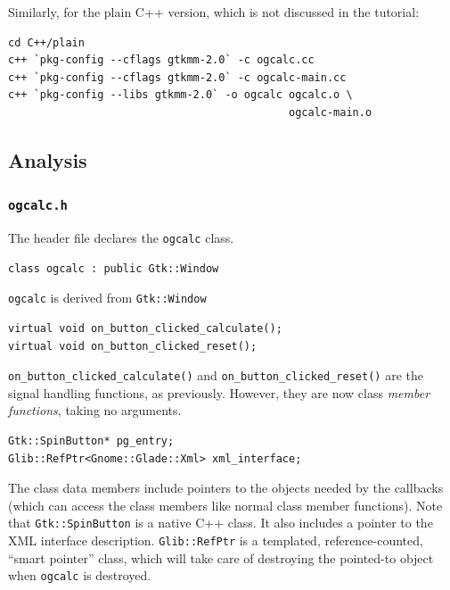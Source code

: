 \documentclass[a4paper,oneside]{article}
\newcommand{\filename}[1]{\texttt{#1}}
\newcommand{\class}[1]{\texttt{#1}}
\newcommand{\function}[1]{\texttt{#1()}}
\begin{document}
Similarly, for the plain C++ version, which is not discussed in the
tutorial:

\begin{verbatim}
cd C++/plain
c++ `pkg-config --cflags gtkmm-2.0` -c ogcalc.cc
c++ `pkg-config --cflags gtkmm-2.0` -c ogcalc-main.cc
c++ `pkg-config --libs gtkmm-2.0` -o ogcalc ogcalc.o \
                                            ogcalc-main.o
\end{verbatim}

\subsection{Analysis}

\subsubsection{\filename{ogcalc.h}}

The header file declares the \class{ogcalc} class.

\begin{lstlisting}[numbers=none, language={[GNU]C++}]
class ogcalc : public Gtk::Window
\end{lstlisting}

\class{ogcalc} is derived from \class{Gtk::Window}

\begin{lstlisting}[numbers=none, language={[GNU]C++}]
virtual void on_button_clicked_calculate();
virtual void on_button_clicked_reset();
\end{lstlisting}

\function{on\_button\_clicked\_calculate} and
\function{on\_button\_clicked\_reset} are the signal handling
functions, as previously.  However, they are now class \emph{member
  functions}, taking no arguments.

\begin{lstlisting}[numbers=none, language={[GNU]C++}]
Gtk::SpinButton* pg_entry;
Glib::RefPtr<Gnome::Glade::Xml> xml_interface;
\end{lstlisting}

The class data members include pointers to the objects needed by the
callbacks (which can access the class members like normal class member
functions).  Note that \class{Gtk::SpinButton} is a native C++ class.
It also includes a pointer to the XML interface description.
\class{Glib::RefPtr} is a templated, reference-counted, ``smart
pointer'' class, which will take care of destroying the pointed-to
object when \class{ogcalc} is destroyed.
\end{document}
